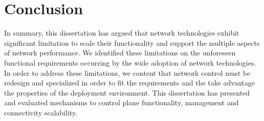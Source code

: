 
\section{Conclusion}

In summary, this dissertation has argued that network technologies exhibit
significant limitation to scale their functionality and support the multiple
aspects of network performance. We identified these limitations on the
unforeseen functional requirements occurring  by the wide adoption of network
technologies. In order to address these limitations, we content that network
control must be redesign and specialized in order to fit the requirements and
the take advantage the properties of the deployment environment. This
dissertation has presented and evaluated mechanisms to control plane
functionality, management and connectivity scalability. 




